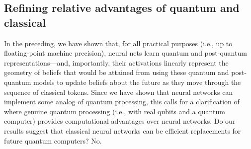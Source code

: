 \documentclass[prx,nofootinbib,onecolumn,showkeys,groupaddress,preprintnumbers,floatfix,
superscriptaddress]{revtex4-1}
\begin{document}
\subsection{Refining relative advantages of quantum and classical}



In the preceding, we have shown that, for all practical purposes (i.e., up to floating-point machine precision), neural nets learn quantum and post-quantum representations---and, importantly, 
their activations linearly represent the 
geometry of beliefs 
that would be attained from using these 
quantum and post-quantum models
to update beliefs about the future as they move through the sequence of classical tokens.
%
Since we have shown that neural networks can implement some analog of quantum processing, this calls for a clarification of where genuine quantum processing (i.e., with real qubits and a quantum computer) provides computational advantages over neural networks.
Do our results 
suggest that classical neural networks can be efficient replacements for future quantum computers?  No.


\end{document}
